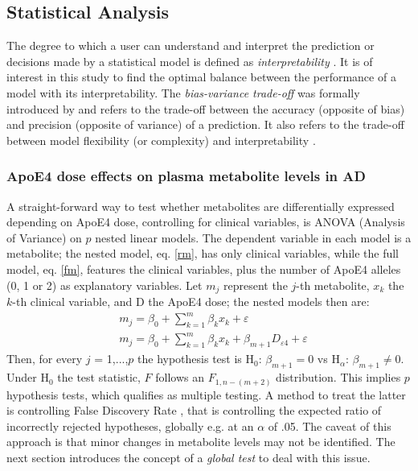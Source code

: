 \documentclass{amsart}
\theoremstyle{plain}
\begin{document}
\subsection{Statistical Analysis}
The degree to which a user can understand and interpret the prediction or decisions made by a statistical model is defined as \textit{interpretability} \cite{Elshawi2019OnHypertension}. It is of interest in this study to find the optimal balance between the performance of a model with its interpretability. The \textit{bias-variance trade-off} was formally introduced by \citeauthor{Geman1992NeuralDilemma} and refers to the trade-off between the accuracy (opposite of bias) and precision (opposite of variance) of a prediction. It also refers to the trade-off between model flexibility (or complexity) and interpretability \cite{Geman1992NeuralDilemma}.

\subsubsection{ApoE4 dose effects on plasma metabolite levels in AD}
A straight-forward way to test whether metabolites are differentially expressed depending on ApoE4 dose, controlling for clinical variables, is ANOVA (Analysis of Variance) on $p$ nested linear models. The dependent variable in each model is a metabolite; the nested model, eq. \eqref{rm}, has only clinical variables, while the full model, eq. \eqref{fm}, features the clinical variables, plus the number of ApoE4 alleles (0, 1 or 2) as explanatory variables. Let $m_j$ represent the $j$-th metabolite, $x_k$ the $k$-th clinical variable, and D the ApoE4 dose; the nested models then are:
\begin{align}
    & m_j = \beta_0 + \sum_{k=1}^m\beta_kx_k +\varepsilon \label{rm} \\
    & m_j = \beta_0 + \sum_{k=1}^m\beta_kx_k + \beta_{m+1}D_{\varepsilon4} + \varepsilon \label{fm}
\end{align}
Then, for every $j$ = 1,...,$p$ the hypothesis test is H$_0$: $\beta_{m+1} = 0 $ vs H$_\alpha$: $\beta_{m+1} \neq 0$. Under H$_0$ the test statistic, $F$ follows an $F_{1, n-(m+2)}$ distribution. This implies $p$ hypothesis tests, which qualifies as multiple testing. A method to treat the latter is controlling False Discovery Rate \cite{Benjamini1995ControllingTesting}, that is controlling the expected ratio of incorrectly rejected hypotheses, globally e.g. at an $\alpha$ of .05. The caveat of this approach is that minor changes in metabolite levels may not be identified. The next section introduces the concept of a \textit{global test} to deal with this issue.
\end{document}
